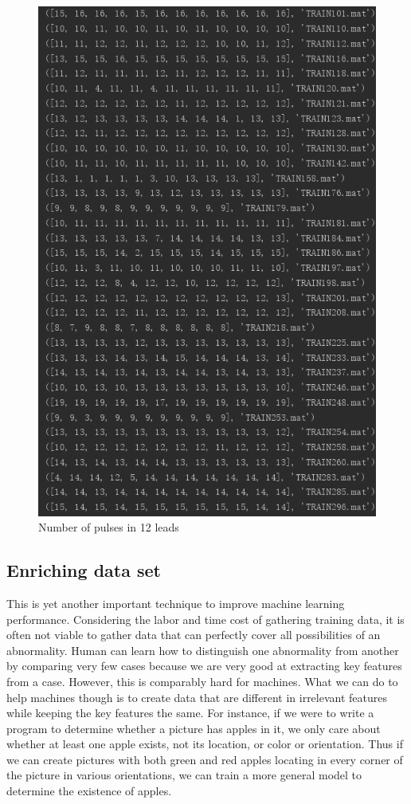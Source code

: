 \documentclass[runningheads]{llncs}
\begin{document}
\begin{figure}[H]
	\includegraphics[width=0.8\linewidth]{img/pulse_num.png}
	\caption{\label{fig:pulse_num} Number of pulses in 12 leads}
\end{figure}

\subsection{Enriching data set}
This is yet another important technique to improve machine learning performance. Considering the labor and time cost of gathering training data, it is often not viable to gather data that can perfectly cover all possibilities of an abnormality. Human can learn how to distinguish one abnormality from another by comparing very few cases because we are very good at extracting key features from a case. However, this is comparably hard for machines. What we can do to help machines though is to create data that are different in irrelevant features while keeping the key features the same. For instance, if we were to write a program to determine whether a picture has apples in it, we only care about whether at least one apple exists, not its location, or color or orientation. Thus if we can create pictures with both green and red apples locating in every corner of the picture in various orientations, we can train a more general model to determine the existence of apples.
\end{document}
